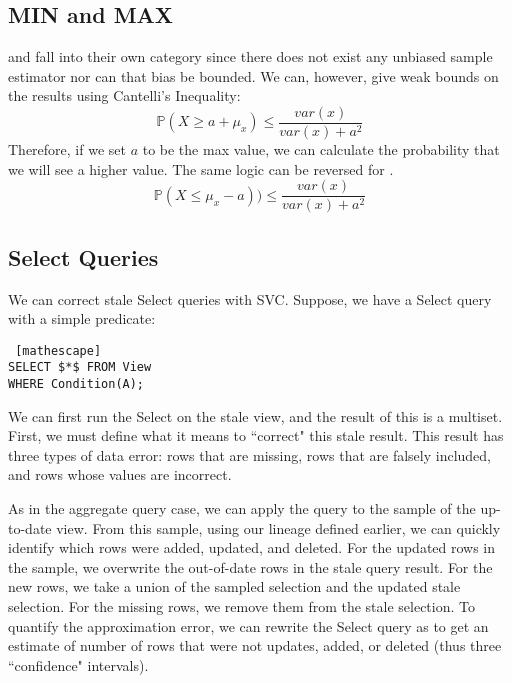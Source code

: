 \subsection{MIN and MAX}
\minfunc and \maxfunc fall into their own category since there does not exist any unbiased sample estimator nor can that bias be bounded.
We can, however, give weak bounds on the results using Cantelli's Inequality:
\[
\mathbb{P}(X \ge a + \mu_x ) \le \frac{var(x)}{var(x) + a^2}
\]
Therefore, if we set $a$ to be the max value, we can calculate the probability that we will see a higher value. The same logic can be reversed for \minfunc.
\[
\mathbb{P}(X \le \mu_x - a )) \le \frac{var(x)}{var(x) + a^2}
\]

\subsection{Select Queries}
We can correct stale Select queries with SVC.
Suppose, we have a Select query with a simple predicate:
\begin{lstlisting} [mathescape]
SELECT $*$ FROM View 
WHERE Condition(A);
\end{lstlisting}

We can first run the Select on the stale view, and the result of this is a multiset.
First, we must define what it means to ``correct" this stale result.
This result has three types of data error: rows that are missing, rows that are falsely included, and rows whose values are incorrect.

As in the aggregate query case, we can apply the query to the sample of the up-to-date view.
From this sample, using our lineage defined earlier, we can quickly identify which rows were added, updated, and deleted.
For the updated rows in the sample, we overwrite the out-of-date rows in the stale query result.
For the new rows, we take a union of the sampled selection and the updated stale selection.
For the missing rows, we remove them from the stale selection.
To quantify the approximation error, we can rewrite the Select query as \countfunc to get an estimate of number of rows that were not updates, added, or deleted (thus three ``confidence" intervals). 

